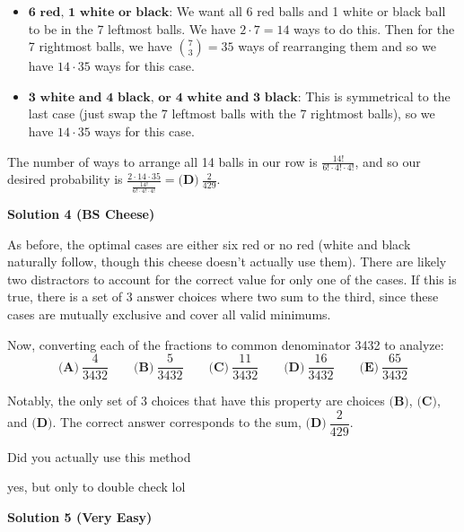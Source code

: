 \begin{enumerate}
 
            \begin{itemize}
        \item $\textbf{6 red, 1 white or black}$: We want all 6 red balls and 1 white or black ball to be in the 7 leftmost balls. We have $2 \cdot 7 = 14$ ways to do this. Then for the 7 rightmost balls, we have $\binom{7}{3}=35$ ways of rearranging them and so we have $14 \cdot 35$ ways for this case.
            \end{itemize}
            
            \begin{itemize}
        \item $\textbf{3 white and 4 black, or 4 white and 3 black}$: This is symmetrical to the last case (just swap the 7 leftmost balls with the 7 rightmost balls), so we have $14 \cdot 35$ ways for this case.
            \end{itemize}
            The number of ways to arrange all 14 balls in our row is $\frac{14!}{6! \cdot 4! \cdot 4!}$, and so our desired probability is $\frac{2 \cdot 14 \cdot 35}{\frac{14!}{6! \cdot 4! \cdot 4!}}=\boxed{\textbf{(D)}~\frac{2}{429}}$.

 



\textbf{Solution 4 (BS Cheese)}

As before, the optimal cases are either six red or no red (white and black naturally follow, though this cheese doesn't actually use them). There are likely two distractors to account for the correct value for only one of the cases. If this is true, there is a set of 3 answer choices where two sum to the third, since these cases are mutually exclusive and cover all valid minimums.

 Now, converting each of the fractions to common denominator 3432 to analyze: 
 \[\textbf{(A)}\   \dfrac{4}{3432}  \qquad 	\textbf{(B)}\   \dfrac{5}{3432}  \qquad 	\textbf{(C)}\   \dfrac{11}{3432}  \qquad 	\textbf{(D)}\   \dfrac{16}{3432}  \qquad 	\textbf{(E)}\   \dfrac{65}{3432}\]

 Notably, the only set of 3 choices that have this property are choices $\textbf{(B)}$, $\textbf{(C)}$, and $\textbf{(D)}$. The correct answer corresponds to the sum, $\boxed{\textbf{(D)}\   \dfrac{2}{429}}$.

 Did you actually use this method

 yes, but only to double check lol

 



\textbf{Solution 5 (Very Easy)}


\end{enumerate}
